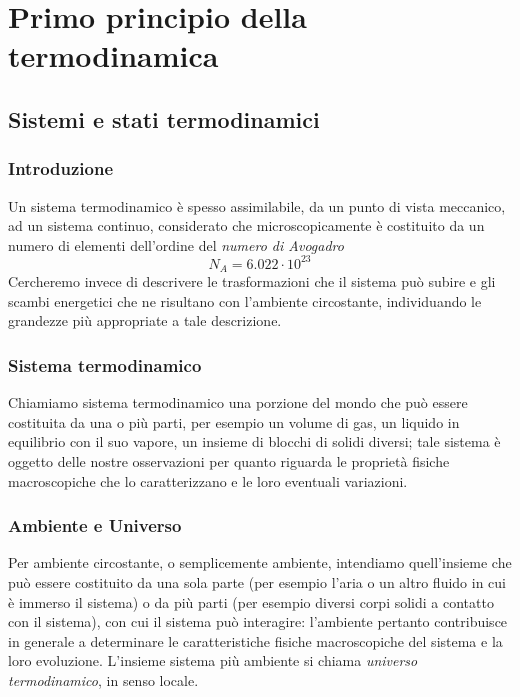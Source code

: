 \documentclass[class=book, crop=false, oneside, 12pt]{standalone}
\begin{document}
\chapter{Primo principio della termodinamica}

\section{Sistemi e stati termodinamici}

\subsection{Introduzione}

Un sistema termodinamico è spesso assimilabile, da un punto di vista meccanico, ad un sistema continuo, considerato che microscopicamente è costituito da un numero di elementi dell'ordine del \emph{numero di Avogadro}
\begin{equation*}
    N_A = 6.022 \cdot 10^{23}
\end{equation*}
Cercheremo invece di descrivere le trasformazioni che il sistema può subire e gli scambi energetici che ne risultano con l'ambiente circostante, individuando le grandezze più appropriate a tale descrizione.

\subsection{Sistema termodinamico}

Chiamiamo sistema termodinamico una porzione del mondo che può essere costituita da una o più parti, per esempio un volume di gas, un liquido in equilibrio con il suo vapore, un insieme di blocchi di solidi diversi; tale sistema è oggetto delle nostre osservazioni per quanto riguarda le proprietà fisiche macroscopiche che lo caratterizzano e le loro eventuali variazioni. 

\subsection{Ambiente e Universo}

Per ambiente circostante, o semplicemente ambiente, intendiamo quell'insieme che può essere costituito da una sola parte (per esempio l'aria o un altro fluido in cui è immerso il sistema) o da più parti (per esempio diversi corpi solidi a contatto con il sistema), con cui il sistema può interagire: l'ambiente pertanto contribuisce in generale a determinare le caratteristiche fisiche macroscopiche del sistema e la loro evoluzione.\newline
L'insieme sistema più ambiente si chiama \emph{universo termodinamico}, in senso locale.
\end{document}
